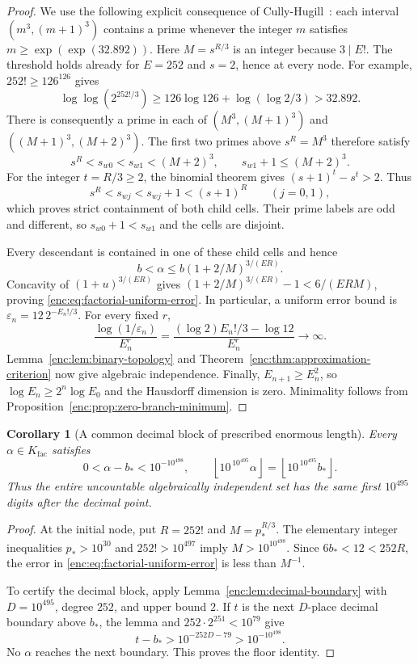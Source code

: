 \documentclass[11pt,a4paper]{article}
\newtheorem{corollary}[theorem]{Corollary}
\theoremstyle{definition}
\theoremstyle{remark}
\numberwithin{equation}{section}
\begin{document}
\begin{proof}
We use the following explicit consequence of
Cully-Hugill~\cite[Section~4]{CullyHugill2023}: each interval
$(m^3,(m+1)^3)$ contains a prime whenever the integer $m$ satisfies
$m\ge\exp(\exp(32.892))$.
Here $M=s^{R/3}$ is an integer because $3\mid E!$.  The threshold holds
already for $E=252$ and $s=2$, hence at every node.  For example,
$252!\ge126^{126}$ gives
\[
 \log\log(2^{252!/3})
 \ge126\log126+\log(\log2/3)>32.892.
\]
There is consequently a prime in each of
$(M^3,(M+1)^3)$ and $((M+1)^3,(M+2)^3)$.  The first two primes above
$s^R=M^3$ therefore satisfy
\[
 s^R<s_{w0}<s_{w1}<(M+2)^3,
 \qquad s_{w1}+1\le(M+2)^3.
\]
For the integer $t=R/3\ge2$, the binomial theorem gives
$(s+1)^t-s^t>2$.  Thus
\[
 s^R<s_{wj}<s_{wj}+1<(s+1)^R\qquad(j=0,1),
\]
which proves strict containment of both child cells.  Their prime labels
are odd and different, so $s_{w0}+1<s_{w1}$ and the cells are disjoint.

Every descendant is contained in one of these child cells and hence
\[
 b<\alpha\le b(1+2/M)^{3/(ER)}.
\]
Concavity of $(1+u)^{3/(ER)}$ gives
$(1+2/M)^{3/(ER)}-1<6/(ERM)$, proving
\eqref{enc:eq:factorial-uniform-error}.  In particular, a uniform error bound is
$\varepsilon_n=12\,2^{-E_n!/3}$.  For every fixed $r$,
\[
 \frac{\log(1/\varepsilon_n)}{E_n^r}
 =\frac{(\log2)E_n!/3-\log12}{E_n^r}\longrightarrow\infty.
\]
Lemma~\ref{enc:lem:binary-topology} and
Theorem~\ref{enc:thm:approximation-criterion} now give algebraic independence.
Finally, $E_{n+1}\ge E_n^2$, so $\log E_n\ge2^n\log E_0$ and the Hausdorff
dimension is zero.  Minimality follows from
Proposition~\ref{enc:prop:zero-branch-minimum}.
\end{proof}

\begin{corollary}[A common decimal block of prescribed enormous length]
\label{enc:cor:factorial-common-digits}
Every $\alpha\in K_{\mathrm{fac}}$ satisfies
\[
 0<\alpha-b_*<10^{-10^{498}},
 \qquad
 \left\lfloor10^{\,10^{495}}\alpha\right\rfloor
 =\left\lfloor10^{\,10^{495}}b_*\right\rfloor.
\]
Thus the entire uncountable algebraically independent set has the same
first $10^{495}$ digits after the decimal point.
\end{corollary}

\begin{proof}
At the initial node, put $R=252!$ and $M=p_*^{R/3}$.  The elementary
integer inequalities $p_*>10^{30}$ and $252!>10^{497}$ imply
$M>10^{10^{498}}$.  Since $6b_*<12<252R$, the error in
\eqref{enc:eq:factorial-uniform-error} is less than $M^{-1}$.

To certify the decimal block, apply Lemma~\ref{enc:lem:decimal-boundary} with
$D=10^{495}$, degree $252$, and upper bound $2$.  If $t$ is the next
$D$-place decimal boundary above $b_*$, the lemma and
$252\cdot2^{251}<10^{79}$ give
\[
 t-b_*>10^{-252D-79}>10^{-10^{498}}.
\]
No $\alpha$ reaches the next boundary.  This proves the floor identity.
\end{proof}
\end{document}
